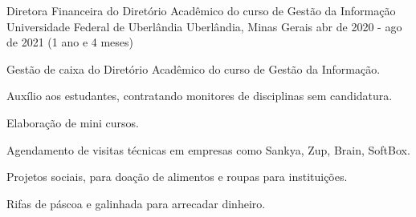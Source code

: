 \cventry
    {Diretora Financeira do Diretório Acadêmico do curso de Gestão da Informação} %
    {Universidade Federal de Uberlândia} %
    {Uberlândia, Minas Gerais} %
    {abr de 2020 - ago de 2021 (1 ano e 4 meses)} %
    {
        \begin{cvitems} %
            \item {Gestão de caixa do Diretório Acadêmico do curso de Gestão da Informação.}
            \item {Auxílio aos estudantes, contratando monitores de disciplinas sem candidatura.}
            \item {Elaboração de mini cursos.}
            \item {Agendamento de visitas técnicas em empresas como Sankya, Zup, Brain, SoftBox.}
            \item {Projetos sociais, para doação de alimentos e roupas para instituições.}
            \item {Rifas de páscoa e galinhada para arrecadar dinheiro.}
        \end{cvitems}
    }